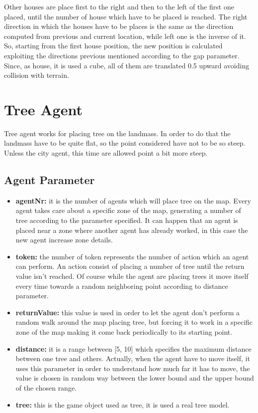 \documentclass[12pt]{article}
\begin{document}
    Other houses are place first to the right and then to the left of the first one placed, until the number of house which have to be placed is reached. The right direction in which
    the houses have to be places is the same as the direction computed from previous and current location, while left one is the inverse of it. So, starting from the first house position,
    the new position is calculated exploiting the directions previous mentioned according to the gap parameter. Since, as house, it is used a cube, all of them are translated 0.5 upward
    avoiding collision with terrain.

    \section{Tree Agent}
    Tree agent works for placing tree on the landmass. In order to do that the landmass have to be quite flat, so the point considered have not to be so steep. Unless the city agent,
    this time are allowed point a bit more steep. 

    \subsection{Agent Parameter}

    \begin{itemize}
        \item \textbf{agentNr:} it is the number of agents which will place tree on the map. Every agent takes care about a specific zone of the map, generating a number of tree
        according to the parameter specified. It can happen that an agent is placed near a zone where another agent has already worked, in this case the new agent increase
        zone details.
        \item \textbf{token:} the number of token represents the number of action which an agent can perform. An action consist of placing a number of tree until the return value
        isn't reached. Of course while the agent are placing trees it move itself every time towards a random neighboring point according to distance parameter.
        \item \textbf{returnValue:} this value is used in order to let the agent don't perform a random walk around the map placing tree, but forcing it to work in a specific zone of 
        the map making it come back periodically to its starting point.
        \item \textbf{distance:} it is a range between [5, 10] which specifies the maximum distance between one tree and others. Actually, when the agent have to move itself, it uses this
        parameter in order to understand how much far it has to move, the value is chosen in random way between the lower bound and the upper bound of the chosen range.
        \item \textbf{tree:} this is the game object used as tree, it is used a real tree model.
    \end{itemize}
\end{document}
